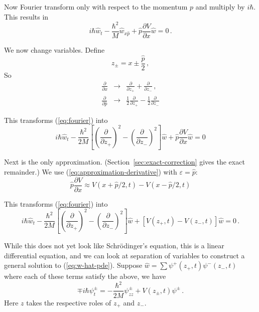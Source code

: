 \documentclass[12pt]{article}
\begin{document}
Now Fourier transform only with respect to the momentum $p$ and multiply by $i\hbar$. This results in
\begin{equation}\label{eq:fourier}
i\hbar \hat{w}_t - \frac{\hbar^2}{M} \hat{w}_{x\hat{p}} + \hat{p} \frac{\partial V}{\partial x} \hat{w} = 0 \,.
\end{equation}

We now change variables. Define
\begin{equation}
z_{\pm} = x \pm \frac{\hat{p}}{2} \,,
\end{equation}
So
\begin{eqnarray}
\frac{\partial}{\partial x} & \rightarrow & \frac{\partial}{\partial z_+} + \frac{\partial}{\partial z_-}\,,\\
\frac{\partial}{\partial \hat{p}} & \rightarrow & \frac{1}{2}\frac{\partial}{\partial z_+}
- \frac{1}{2}\frac{\partial}{\partial z_-}
\end{eqnarray}

This transforms (\ref{eq:fourier}) into
\begin{equation}\label{eq:w-hat-pde-vprime}
i\hbar \hat{w}_t - \frac{\hbar^2}{2M}
\left[\left(\frac{\partial}{\partial z_{+}}\right)^2 - \left(\frac{\partial}{\partial z_{-}}\right)^2\right]\hat{w}
+ \hat{p} \frac{\partial V}{\partial x} \hat{w} = 0
\end{equation}

Next is the only approximation. (Section~\ref{sec:exact-correction} gives the exact remainder.) We use (\ref{eq:approximation-derivative}) with $\varepsilon = \hat{p}$:
\begin{equation}\label{eq:w-hat-pde-approximation}
\hat{p} \frac{\partial V}{\partial x}
\approx V(x+\hat{p}/2,t) - V(x-\hat{p}/2,t)
\end{equation}

This transforms (\ref{eq:fourier}) into
\begin{equation}\label{eq:w-hat-pde}
i\hbar \hat{w}_t - \frac{\hbar^2}{2M}
\left[\left(\frac{\partial}{\partial z_{+}}\right)^2 - \left(\frac{\partial}{\partial z_{-}}\right)^2\right]\hat{w}
+ [V(z_+,t) - V(z_-,t)]\hat{w} = 0 \,.
\end{equation}

While this does not yet look like Schr\"odinger's equation, this is a linear differential
equation, and we can look at separation of variables to construct a general solution to (\ref{eq:w-hat-pde}).
Suppose $\hat{w} = \sum \psi^+(z_+,t)\psi^-(z_-,t)$ where each of these terms satisfy the above, we have
\begin{equation}
\mp i\hbar \psi_t^{\pm} = -\frac{\hbar^2}{2M}\psi^{\pm}_{zz} + V(z_\pm,t) \psi^{\pm} \,.
\end{equation}
Here $z$ takes the respective roles of $z_+$ and $z_-$.
\end{document}
